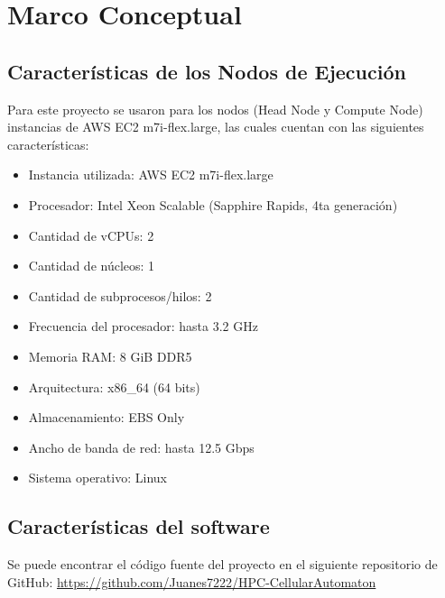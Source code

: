 
\section{Marco Conceptual}
\label{sec:Marco Conceptual}

\subsection{Características de los Nodos de Ejecución}
\label{sec:Características de los Nodos de Ejecución} 

Para este proyecto se usaron para los nodos (Head Node y Compute Node) instancias de AWS EC2 m7i-flex.large, las cuales cuentan con las siguientes características:

\begin{itemize}
   \item Instancia utilizada: AWS EC2 m7i-flex.large
   \item Procesador: Intel Xeon Scalable (Sapphire Rapids, 4ta generación)
   \item Cantidad de vCPUs: 2
   \item Cantidad de núcleos: 1
   \item Cantidad de subprocesos/hilos: 2
   \item Frecuencia del procesador: hasta 3.2 GHz
   \item Memoria RAM: 8 GiB DDR5
   \item Arquitectura: x86\_64 (64 bits)
   \item Almacenamiento: EBS Only
   \item Ancho de banda de red: hasta 12.5 Gbps
   \item Sistema operativo: Linux
\end{itemize}

\subsection{Características del software}

Se puede encontrar el código fuente del proyecto en el siguiente repositorio de GitHub: \url{https://github.com/Juanes7222/HPC-CellularAutomaton}
